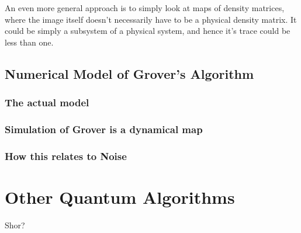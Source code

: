 An even more general approach is to simply look at maps of
density matrices, where the image itself doesn't necessarily have to
be a physical density matrix.  It could be simply a subsystem
of a physical system, and hence it's trace could be less than
one.


\subsection{Numerical Model of Grover's Algorithm}

\subsubsection{The actual model}

\subsubsection{Simulation of Grover is a dynamical map}

\subsubsection{How this relates to Noise}




\section{Other Quantum Algorithms}

Shor?
